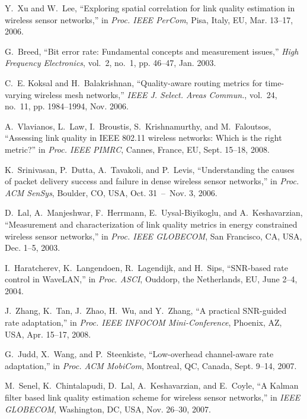 \documentclass[11pt,draftclsnofoot,journal,onecolumn]{IEEEtran}
\begin{document}
\begin{thebibliography}{10}
Y.~{Xu} and W.~{Lee}, ``Exploring spatial correlation for link quality
  estimation in wireless sensor networks,'' in \emph{Proc. IEEE PerCom}, Pisa,
  Italy, EU, Mar. 13--17, 2006.

G.~{Breed}, ``Bit error rate: Fundamental concepts and measurement issues,''
  \emph{High Frequency Electronics}, vol.~2, no.~1, pp. 46--47, Jan. 2003.

C.~E. {Koksal} and H.~{Balakrishnan}, ``Quality-aware routing metrics for
  time-varying wireless mesh networks,'' \emph{{IEEE} J. Select. Areas
  Commun.}, vol.~24, no.~11, pp. 1984--1994, Nov. 2006.

A.~{Vlavianos}, L.~{Law}, I.~{Broustis}, S.~{Krishnamurthy}, and
  M.~{Faloutsos}, ``Assessing link quality in {IEEE} 802.11 wireless networks:
  Which is the right metric?'' in \emph{Proc. IEEE PIMRC}, Cannes, France, EU,
  Sept. 15--18, 2008.

K.~{Srinivasan}, P.~{Dutta}, A.~{Tavakoli}, and P.~{Levis}, ``Understanding the
  causes of packet delivery success and failure in dense wireless sensor
  networks,'' in \emph{Proc. ACM SenSys}, Boulder, CO, USA, Oct. 31~--~Nov. 3,
  2006.

D.~{Lal}, A.~{Manjeshwar}, F.~{Herrmann}, E.~Uysal-Biyikoglu, and
  A.~{Keshavarzian}, ``Measurement and characterization of link quality metrics
  in energy constrained wireless sensor networks,'' in \emph{Proc. IEEE
  GLOBECOM}, San Francisco, CA, USA, Dec. 1--5, 2003.

I.~{Haratcherev}, K.~{Langendoen}, R.~{Lagendijk}, and H.~{Sips}, ``{SNR-based}
  rate control in {WaveLAN},'' in \emph{Proc. ASCI}, Ouddorp, the Netherlands,
  EU, June 2--4, 2004.

J.~{Zhang}, K.~{Tan}, J.~{Zhao}, H.~{Wu}, and Y.~{Zhang}, ``A practical
  {SNR}-guided rate adaptation,'' in \emph{Proc. IEEE INFOCOM Mini-Conference},
  Phoenix, AZ, USA, Apr. 15--17, 2008.

G.~{Judd}, X.~{Wang}, and P.~{Steenkiste}, ``Low-overhead channel-aware rate
  adaptation,'' in \emph{Proc. ACM MobiCom}, Montreal, QC, Canada, Sept. 9--14,
  2007.

M.~{Senel}, K.~{Chintalapudi}, D.~{Lal}, A.~{Keshavarzian}, and E.~{Coyle}, ``A
  {Kalman} filter based link quality estimation scheme for wireless sensor
  networks,'' in \emph{IEEE GLOBECOM}, Washington, DC, USA, Nov. 26--30, 2007.


\end{thebibliography}
\end{document}
